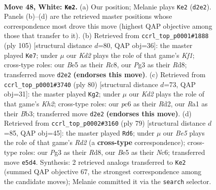 \documentclass[11pt]{article}
\begin{document}
\clearpage

\begin{figure}[p]\centering
\begin{subfigure}{0.46\textwidth}\centering
\resizebox{\linewidth}{!}{%
\newchessgame
\chessboard[
  setfen={5br1/1r1k2p1/p1p5/Pp1bBp1p/2p4P/4PPP1/1P1K3N/R5R1 w - - 0 48},
  showmover=false,
  pgfstyle=straightmove, color=movearrow, markmove={d2-e2}
]}
\caption{}
\end{subfigure}\hfill
\begin{subfigure}{0.46\textwidth}\centering
\resizebox{\linewidth}{!}{%
\newchessgame
\chessboard[
  setfen={2rr1k2/5b2/1p1ppp2/7p/PNP1P1pn/1P1B4/3R1PP1/3R2K1 b - - 0 53},
  showmover=false,
  pgfstyle=straightmove, color=movearrow, markmove={f8-e7}
]}
\caption{}
\end{subfigure}
\\[4pt]
\begin{subfigure}{0.46\textwidth}\centering
\resizebox{\linewidth}{!}{%
\newchessgame
\chessboard[
  setfen={1r2k3/1b2brp1/3p1p1p/pPp1pP2/P1P1P1PP/1BNR4/3R3K/8 w - - 0 41},
  showmover=false,
  pgfstyle=straightmove, color=movearrow, markmove={h2-g2}
]}
\caption{}
\end{subfigure}\hfill
\begin{subfigure}{0.46\textwidth}\centering
\resizebox{\linewidth}{!}{%
\newchessgame
\chessboard[
  setfen={3r4/2pr1kpp/2n2p2/pp5P/3P2P1/1PP1BK2/5P2/R1R5 b - - 5 40},
  showmover=false,
  pgfstyle=straightmove, color=movearrow, markmove={d7-d6}
]}
\caption{}
\end{subfigure}
\caption{\textbf{Move 48, White: \texttt{Ke2}.} (a) Our position; Melanie plays \texttt{Ke2} (\texttt{d2e2}). Panels (b)--(d) are the retrieved master positions whose correspondence most drove this move (highest QAP objective among those that transfer to it). (b) Retrieved from \texttt{ccrl\_top\_p0001\#1888} (ply 105) [structural distance $d$=80, QAP obj=36]: the master played \texttt{Ke7}; under $\mu$ our \emph{Kd2} plays the role of that game's \emph{Kf1}; cross-type roles: our \emph{B}e5 as their \emph{R}c8, our \emph{P}g3 as their \emph{R}d8; transferred move \texttt{d2e2} \textbf{(endorses this move)}. (c) Retrieved from \texttt{ccrl\_top\_p0001\#3740} (ply 80) [structural distance $d$=73, QAP obj=31]: the master played \texttt{Kg2}; under $\mu$ our \emph{Kd2} plays the role of that game's \emph{Kh2}; cross-type roles: our \emph{p}c6 as their \emph{R}d2, our \emph{R}a1 as their \emph{B}b3; transferred move \texttt{d2e2} \textbf{(endorses this move)}. (d) Retrieved from \texttt{ccrl\_top\_p0002\#3160} (ply 79) [structural distance $d$=85, QAP obj=45]: the master played \texttt{Rd6}; under $\mu$ our \emph{Be5} plays the role of that game's \emph{Rd2} (a \textbf{cross-type} correspondence); cross-type roles: our \emph{P}g3 as their \emph{R}d8, our \emph{B}e5 as their \emph{N}c6; transferred move \texttt{e5d4}. Synthesis: 2 retrieved analogs transferred to \texttt{Ke2} (summed QAP objective 67, the strongest correspondence among the candidate moves); Melanie committed it via the \texttt{search} selector.}
\label{fig:thought-m94}
\end{figure}
\end{document}
